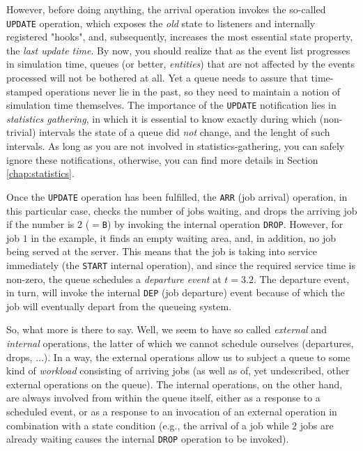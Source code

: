 However, before doing anything,
the arrival operation invokes
the so-called \lstinline|UPDATE| operation,
which exposes the {\em old\/} state
to listeners and internally registered "hooks",
and, subsequently, increases the most essential state
property, the {\em last update time}.
By now, you should realize that
as the event list progresses in simulation time,
queues (or better, {\em entities\/})
that are not affected by the events processed
will not be bothered at all.
Yet a queue needs to assure that time-stamped operations
never lie in the past,
so they need to maintain a notion of simulation time themselves.
The importance of the \lstinline|UPDATE| notification
lies in {\em statistics gathering},
in which it is essential to know exactly
during which (non-trivial) intervals
the state of a queue did {\em not\/} change,
and the lenght of such intervals.
As long as you are not involved in statistics-gathering,
you can safely ignore these notifications,
otherwise,
you can find more details in Section \ref{chap:statistics}.

Once the \lstinline|UPDATE| operation has been
fulfilled, the \lstinline|ARR| (job arrival) operation,
in this particular case,
checks the number of jobs waiting,
and drops the arriving job if the number is $2$ ($=$\lstinline|B|)
by invoking the internal operation \lstinline|DROP|.
However, for job $1$ in the example,
it finds an empty waiting area,
and, in addition, no job being served at the server.
This means that the job is taking into service immediately
(the \lstinline|START| internal operation),
and since the required service time is non-zero,
the queue schedules a {\em departure event\/}
at $t=3.2$.
The departure event, in turn,
will invoke the internal \lstinline|DEP| (job departure)
event because of which the job
will eventually depart from the queueing system.

So, what more is there to say.
Well, we seem to have so called {\em external\/}
and {\em internal\/} operations,
the latter of which we cannot schedule ourselves
(departures, drops, $\ldots$).
In a way, the external operations allow us
to subject a queue to some kind of {\em workload\/}
consisting of arriving jobs
(as well as of, yet undescribed, other external operations on the queue).
The internal operations, on the other hand,
are always involved from within the queue itself,
either as a response to a scheduled event,
or as a response to an invocation of an external operation
in combination with a state condition
(e.g., the arrival of a job while $2$ jobs are already waiting
causes the internal \lstinline|DROP| operation to be invoked).


